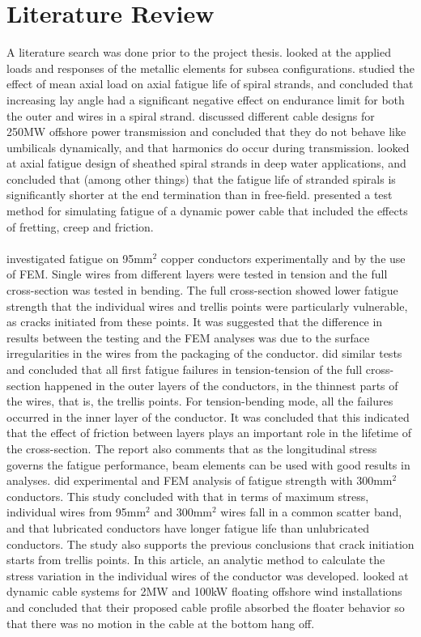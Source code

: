 \section{Literature Review}
A literature search was done prior to the project thesis. \cite{Feld1995} looked at the applied loads and responses of the metallic elements for subsea configurations. \cite{Alani1997Eoma} studied the effect of mean axial load on axial fatigue life of spiral strands, and concluded that increasing lay angle had a significant negative effect on endurance limit for both the outer and wires in a spiral strand. \cite{Chien2004} discussed different cable designs for 250MW offshore power transmission and concluded that they do not behave like umbilicals dynamically, and that harmonics do occur during transmission. \cite{Raoof2008} looked at axial fatigue design of sheathed spiral strands in deep water applications, and concluded that (among other things) that the fatigue life of stranded spirals is significantly shorter at the end termination than in free-field. \cite{Karlsen2010} presented a test method for simulating fatigue of a dynamic power cable that included the effects of fretting, creep and friction.\\\\ \cite{Nasution2013} investigated fatigue on 95mm$^2$ copper conductors experimentally and by the use of FEM. Single wires from different layers were tested in tension and the full cross-section was tested in bending. The full cross-section showed lower fatigue strength that the individual wires and trellis points were particularly vulnerable, as cracks initiated from these points. It was suggested that the difference in results between the testing and the FEM analyses was due to the surface irregularities in the wires from the packaging of the conductor. \cite{NASUTION2014} did similar tests and concluded that all first fatigue failures in tension-tension of the full cross-section happened in the outer layers of the conductors, in the thinnest parts of the wires, that is, the trellis points. For tension-bending mode, all the failures occurred in the inner layer of the conductor. It was concluded that this indicated that the effect of friction between layers plays an important role in the lifetime of the cross-section. The report also comments that as the longitudinal stress governs the fatigue performance, beam elements can be used with good results in analyses. \cite{s300} did experimental and FEM analysis of fatigue strength with 300mm$^2$ conductors. This study concluded with that in terms of maximum stress, individual wires from 95mm$^2$  and 300mm$^2$ wires fall in a common scatter band, and that lubricated conductors have longer fatigue life than unlubricated conductors. The study also supports the previous conclusions that crack initiation starts from trellis points. In this article, an analytic method to calculate the stress variation in the individual wires of the conductor was developed. \cite{Taninok2017} looked at dynamic cable systems for 2MW and 100kW floating offshore wind installations and concluded that their proposed cable profile absorbed the floater behavior so that there was no motion in the cable at the bottom hang off.  

